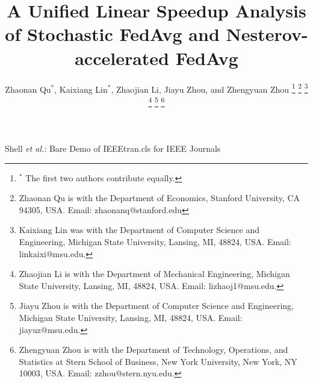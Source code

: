 \documentclass[journal]{IEEEtran}
\begin{document}
\title{A Unified Linear Speedup Analysis of Stochastic FedAvg and Nesterov-accelerated FedAvg}

\author{Zhaonan Qu$^*$, Kaixiang Lin$^*$, Zhaojian Li, Jiayu Zhou, and Zhengyuan Zhou%
\thanks{$^*$ The first two authors contribute equally.}
\thanks{Zhaonan Qu is with the Department of Economics, Stanford University, CA 94305, USA. Email: {zhaonanq}@stanford.edu}%
\thanks{Kaixiang Lin was with the Department of Computer Science and Engineering, Michigan State University, Lansing, MI, 48824,
USA. Email: {linkaixi}@msu.edu.
}%
\thanks{Zhaojian Li is with the Department of
Mechanical Engineering, Michigan State University, Lansing, MI, 48824,
USA. Email: {lizhaoj1}@msu.edu.}
\thanks{Jiayu Zhou is with the Department of Computer Science and Engineering, Michigan State University, Lansing, MI, 48824,
USA. Email: {jiayuz}@msu.edu.}
\thanks{Zhengyuan Zhou is with the Department of Technology, Operations, and Statistics at Stern School of Business, New York University, New York, NY 10003,
USA. Email: {zzhou}@stern.nyu.edu.}
}



%
{Shell \MakeLowercase{\textit{et al.}}: Bare Demo of IEEEtran.cls for IEEE Journals}

\maketitle
\end{document}
